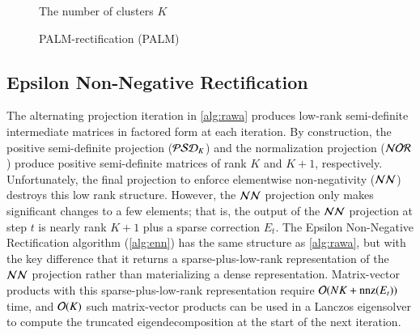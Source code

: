 \begin{figure}[ht]
  \begin{algorithm}[H]
		\DontPrintSemicolon
		\hspace{28px} The number of clusters $K$\\
		\caption{PALM-rectification (PALM)}
	  \label{alg:palm}      
	\end{algorithm}
\end{figure}

\subsection{Epsilon Non-Negative Rectification}
The alternating projection iteration in \cref{alg:rawa} produces
low\hyp{}rank semi\hyp{}definite intermediate matrices in factored form at each
iteration. By construction, the positive semi\hyp{}definite projection 
($\mathcal{PSD}_K$) and the normalization projection ($\mathcal{NOR}$) produce positive
semi\hyp{}definite matrices of rank $K$ and $K+1$, respectively.  Unfortunately,
the final projection to enforce elementwise non-negativity ($\mathcal{NN}$) destroys this
low rank structure. However, the $\mathcal{NN}$ projection only makes significant changes
to a few elements; that is, the output of the $\mathcal{NN}$ projection at step $t$ is
nearly rank $K+1$ plus a sparse correction $E_t$.  The Epsilon Non\hyp{}Negative
Rectification algorithm (\cref{alg:enn}) has the same structure as 
\cref{alg:rawa}, but with the key difference that it returns a
sparse\hyp{}plus\hyp{}low\hyp{}rank representation of the $\mathcal{NN}$ projection
rather than materializing a dense representation. Matrix\hyp{}vector products
with this sparse\hyp{}plus\hyp{}low\hyp{}rank representation require $\mathcal{O}(NK + 
\operatorname{nnz}(E_t))$ time, and $\mathcal{O}(K)$ such matrix\hyp{}vector products
can be used in a Lanczos eigensolver to compute the truncated eigendecomposition
at the start of the next iteration.

